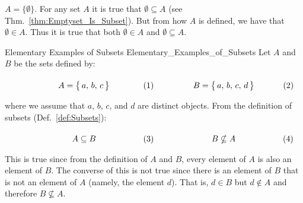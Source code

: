        $A=\{\emptyset\}$. For any set $A$ it is true that
        $\emptyset\subseteq{A}$ (see Thm.~\ref{thm:Emptyset_Is_Subset}). But
        from how $A$ is defined, we have that $\emptyset\in{A}$. Thus it is true
        that both $\emptyset\in{A}$ and $\emptyset\subseteq{A}$.
        \begin{fexample}{Elementary Examples of Subsets}
                        {Elementary_Examples_of_Subsets}
            Let $A$ and $B$ be the sets defined by:
            \par\hfill\par
            \begin{subequations}
                \begin{minipage}[b]{0.49\textwidth}
                    \begin{equation}
                        A=\big\{\,a,\,b,\,c\,\big\}
                    \end{equation}
                \end{minipage}
                \hfill
                \begin{minipage}[b]{0.49\textwidth}
                    \begin{equation}
                        B=\big\{\,a,\,b,\,c,\,d\,\big\}
                    \end{equation}
                \end{minipage}
            \end{subequations}
            \par\vspace{2.5ex}
            where we assume that $a$, $b$, $c$, and $d$ are distinct objects.
            From the definition of subsets (Def.~\ref{def:Subsets}):
            \par\hfill\par
            \begin{subequations}
                \begin{minipage}[b]{0.49\textwidth}
                    \begin{equation}
                        A\subseteq{B}
                    \end{equation}
                \end{minipage}
                \hfill
                \begin{minipage}[b]{0.49\textwidth}
                    \begin{equation}
                        B\nsubseteq{A}
                    \end{equation}
                \end{minipage}
            \end{subequations}
            \par\vspace{2.5ex}
            This is true since from the definition of $A$ and $B$, every element
            of $A$ is also an element of $B$. The converse of this is not true
            since there is an element of $B$ that is not an element of $A$
            (namely, the element $d$). That is, $d\in{B}$ but $d\notin{A}$ and
            therefore $B\nsubseteq{A}$.
        \end{fexample}
